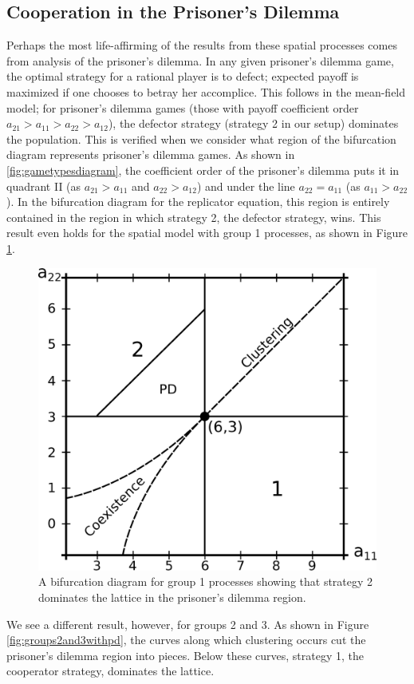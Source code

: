 \documentclass[notitlepage,reqno]{amsart}
\begin{document}
\subsection{Cooperation in the Prisoner's Dilemma}

Perhaps the most life-affirming of the results from these spatial
processes comes from analysis of the prisoner's dilemma. In any given
prisoner's dilemma game, the optimal strategy for a rational player is
to defect; expected payoff is maximized if one chooses to betray her
accomplice. This follows in the mean-field model; for prisoner's
dilemma games (those with payoff coefficient order
$a_{21} > a_{11} > a_{22} > a_{12}$), the defector strategy (strategy
2 in our setup) dominates the population. This is verified when we
consider what region of the bifurcation diagram represents prisoner's
dilemma games. As shown in \ref{fig:gametypesdiagram}, the coefficient
order of the prisoner's dilemma puts it in quadrant II (as
$a_{21}>a_{11}$ and $a_{22}>a_{12}$) and under the line $a_{22} =
a_{11}$ (as $a_{11}>a_{22}$). In the bifurcation diagram for the
replicator equation, this region is entirely contained in the region
in which strategy 2, the defector strategy, wins. This result even
holds for the spatial model with group 1 processes, as shown in
Figure \ref{fig:group1withpd}.

\begin{figure}[h]
\includegraphics[width=.5\textwidth]{./images/group_1_bifurcation_diagram_w_PD.eps}
\caption{A bifurcation diagram for group 1 processes showing that
  strategy 2 dominates the lattice in the prisoner's dilemma region.}
\label{fig:group1withpd}
\end{figure}

We see a different result, however, for groups 2 and 3. As shown in
Figure \ref{fig:groups2and3withpd}, the curves along which clustering
occurs cut the prisoner's dilemma region into pieces. Below these curves,
strategy 1, the cooperator strategy, dominates the lattice.
\end{document}
